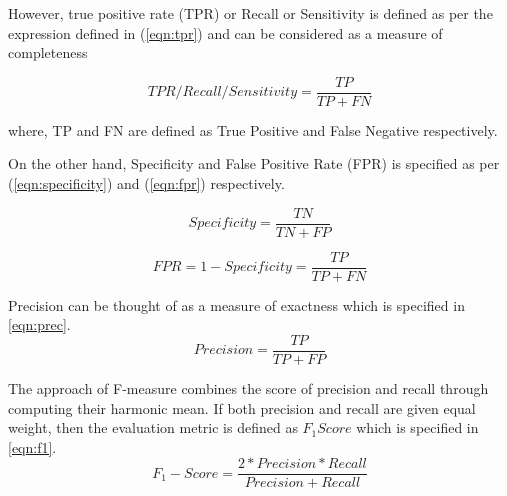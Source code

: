 \documentclass[12pt]{article}
\begin{document}
However, true positive rate (TPR) or Recall or Sensitivity is defined as per the expression defined in (\ref{eqn:tpr}) and can be considered as a measure of completeness

\begin{equation}
\label{eqn:tpr}
TPR / Recall / Sensitivity = \frac{TP}{TP + FN}
\end{equation} 

where, TP and FN are defined as True Positive and False Negative respectively.

On the other hand, Specificity and False Positive Rate (FPR) is specified as per (\ref{eqn:specificity}) and (\ref{eqn:fpr}) respectively.

\begin{equation}
\label{eqn:specificity}
Specificity = \frac{TN}{TN + FP}
\end{equation} 

\begin{equation}
\label{eqn:fpr}
FPR = 1 - Specificity
= \frac{TP}{TP + FN}
\end{equation}

Precision can be thought of as a measure of exactness which is specified in \ref{eqn:prec}. 
\begin{equation}
\label{eqn:prec}
Precision = \frac{TP}{TP + FP}
\end{equation}

The approach of F-measure combines the score of precision and recall through computing their harmonic mean. If both precision and recall are given equal weight, then the evaluation metric is defined as $ F_1 Score $ which is specified in \ref{eqn:f1}. 
\begin{equation}
\label{eqn:f1}
F_1-Score = \frac{2 * Precision * Recall}{Precision + Recall}
\end{equation}
\end{document}
